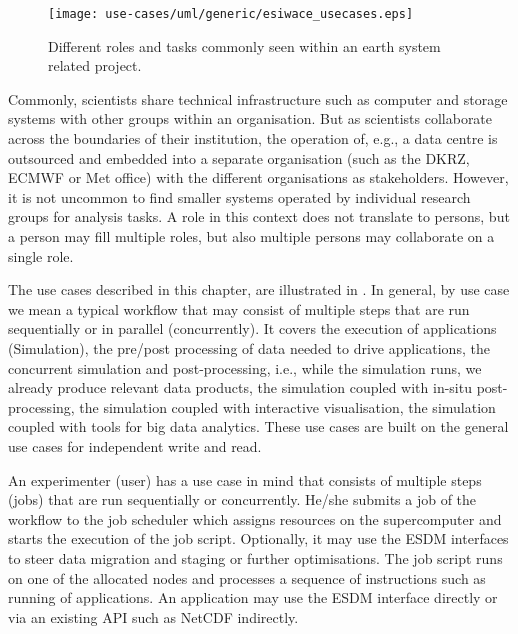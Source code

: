 \begin{figure}
	\centering
	\texttt{[image: use-cases/uml/generic/esiwace\_usecases.eps]}
	\caption{Different roles and tasks commonly seen within an earth system related project.}
	\label{fig:esiwace_usecases}
\end{figure}



\medskip

Commonly, scientists share technical infrastructure such as computer and storage systems with other groups within an organisation.
But as scientists collaborate across the boundaries of their institution, the operation of, e.g., a data centre is outsourced and embedded into a separate organisation (such as the DKRZ, ECMWF or Met office) with the different organisations as stakeholders.
However, it is not uncommon to find smaller systems operated by individual research groups for analysis tasks.
A role in this context does not translate to persons, but a person may fill multiple roles, but also multiple persons may collaborate on a single role.




\medskip

The use cases described in this chapter, are illustrated in .
In general, by use case we mean a typical workflow that may consist of multiple steps that are run sequentially or in parallel (concurrently).
It covers the execution of applications (Simulation),
the pre/post processing of data needed to drive applications,
the concurrent simulation and post-processing, i.e., while the simulation runs, we already produce relevant data products,
the simulation coupled with in-situ post-processing,
the simulation coupled with interactive visualisation,
the simulation coupled with tools for big data analytics.
These use cases are built on the general use cases for independent write and read.


An experimenter (user) has a use case in mind that consists of multiple steps (jobs) that are run sequentially or concurrently.
He/she submits a job of the workflow to the job scheduler which assigns resources on the supercomputer and starts the execution of the job script.
Optionally, it may use the ESDM interfaces to steer data migration and staging or further optimisations.
The job script runs on one of the allocated nodes and processes a sequence of instructions such as running of applications.
An application may use the ESDM interface directly or via an existing API such as NetCDF indirectly.




